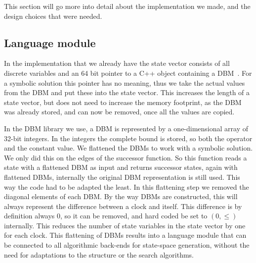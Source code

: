This section will go more into detail about the implementation we made, and the design choices that were needed. 

\subsection{Language module}
In the \ltsmin{} implementation that we already have the state vector consists of all discrete variables and an 64 bit pointer to a C++ object containing a DBM~\cite{eemcs21972}. For a symbolic solution this pointer has no meaning, thus we take the actual values from the DBM and put these into the state vector. This increases the length of a state vector, but does not need to increase the memory footprint, as the DBM was already stored, and can now be removed, once all the values are copied.
 
In the DBM library we use, a DBM is represented by a one-dimensional array of 32-bit integers. In the integers the complete bound is stored, so both the operator and the constant value. We flattened the DBMs to work with a symbolic solution. We only did this on the edges of the successor function. So this function reads a state with a flattened DBM as input and returns successor states, again with flattened DBMs, internally the original DBM representation is still used. This way the code had to be adapted the least. In this flattening step we removed the diagonal elements of each DBM. By the way DBMs are constructed, this will always represent the difference between a clock and itself. This difference is by definition always 0, so it can be removed, and hard coded be set to $(0,\leq)$ internally. This reduces the number of state variables in the state vector by one for each clock. This flattening of DBMs results into a language module that can be connected to all \ltsmin{} algorithmic back-ends for state-space generation, without the need for adaptations to the structure or the search algorithms. 

